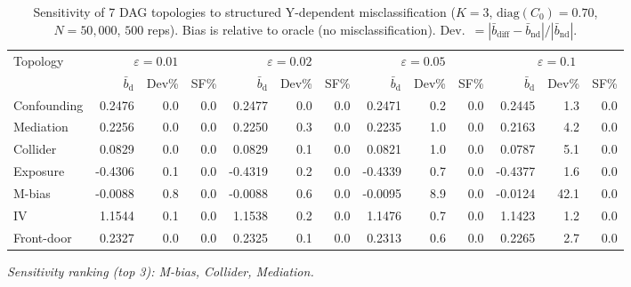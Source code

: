 \begin{table}[t]
\centering
\small
\setlength{\tabcolsep}{4pt}
\caption{Sensitivity of 7 DAG topologies to structured Y-dependent misclassification ($K{=}3$, $\mathrm{diag}(C_0){=}0.70$, $N{=}50{,}000$, $500$ reps). Bias is relative to oracle (no misclassification). Dev.\ $= |\bar{b}_{\mathrm{diff}} - \bar{b}_{\mathrm{nd}}|/|\bar{b}_{\mathrm{nd}}|$.}
\label{tab:structured_nondiff}
\begin{tabular}{lrrrrrrrrrrrr}
\toprule
Topology & \multicolumn{3}{c}{$\varepsilon=0.01$} & \multicolumn{3}{c}{$\varepsilon=0.02$} & \multicolumn{3}{c}{$\varepsilon=0.05$} & \multicolumn{3}{c}{$\varepsilon=0.1$} \\
\cmidrule(lr){2-4} \cmidrule(lr){5-7} \cmidrule(lr){8-10} \cmidrule(lr){11-13}
 & {\scriptsize $\bar{b}_{\mathrm{d}}$} & {\scriptsize Dev\%} & {\scriptsize SF\%} & {\scriptsize $\bar{b}_{\mathrm{d}}$} & {\scriptsize Dev\%} & {\scriptsize SF\%} & {\scriptsize $\bar{b}_{\mathrm{d}}$} & {\scriptsize Dev\%} & {\scriptsize SF\%} & {\scriptsize $\bar{b}_{\mathrm{d}}$} & {\scriptsize Dev\%} & {\scriptsize SF\%} \\
\midrule
Confounding & 0.2476 & 0.0 & 0.0 & 0.2477 & 0.0 & 0.0 & 0.2471 & 0.2 & 0.0 & 0.2445 & 1.3 & 0.0 \\
Mediation & 0.2256 & 0.0 & 0.0 & 0.2250 & 0.3 & 0.0 & 0.2235 & 1.0 & 0.0 & 0.2163 & 4.2 & 0.0 \\
Collider & 0.0829 & 0.0 & 0.0 & 0.0829 & 0.1 & 0.0 & 0.0821 & 1.0 & 0.0 & 0.0787 & 5.1 & 0.0 \\
Exposure & -0.4306 & 0.1 & 0.0 & -0.4319 & 0.2 & 0.0 & -0.4339 & 0.7 & 0.0 & -0.4377 & 1.6 & 0.0 \\
M-bias & -0.0088 & 0.8 & 0.0 & -0.0088 & 0.6 & 0.0 & -0.0095 & 8.9 & 0.0 & -0.0124 & 42.1 & 0.0 \\
IV & 1.1544 & 0.1 & 0.0 & 1.1538 & 0.2 & 0.0 & 1.1476 & 0.7 & 0.0 & 1.1423 & 1.2 & 0.0 \\
Front-door & 0.2327 & 0.0 & 0.0 & 0.2325 & 0.1 & 0.0 & 0.2313 & 0.6 & 0.0 & 0.2265 & 2.7 & 0.0 \\
\bottomrule
\end{tabular}
\par\smallskip\noindent\textit{Sensitivity ranking (top 3): M-bias, Collider, Mediation.}
\end{table}
